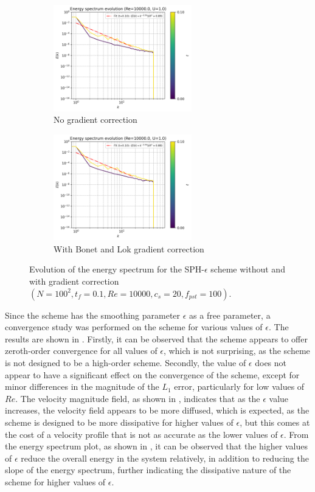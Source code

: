 \begin{figure}[htbp!]
  \begin{subfigure}{7cm}
  \centering\includegraphics[width=6cm]{Code-Figures/mon2017/grad_corr/c0_20_tait_pec_dtmul_1_mkc_no_nx_100_pst_10_re_10000_mon2017/energy_spectrum_evolution.png}
  \caption{No gradient correction}
  \end{subfigure}
  \begin{subfigure}{7cm}
  \centering\includegraphics[width=6cm]{Code-Figures/mon2017/grad_corr/c0_20_tait_pec_dtmul_1_mkc_yes_nx_100_pst_10_re_10000_mon2017/energy_spectrum_evolution.png}
  \caption{With Bonet and Lok gradient correction}
  \end{subfigure}
  \caption{Evolution of the energy spectrum for the SPH-$\epsilon$ scheme without and with gradient correction $(N=100^2, t_f=0.1, Re=10000, c_s=20, f_{pst}=100)$.}
  \label{fig:sph-eps-grad-corr-espec}
\end{figure}

Since the scheme has the smoothing parameter $\epsilon$ as a free parameter, a convergence study was performed on the scheme for various values of $\epsilon$.
The results are shown in . Firstly, it can be observed that the scheme appears to offer zeroth-order convergence for all values of $\epsilon$, which is not surprising, as the scheme is not designed to be a high-order scheme. Secondly, the value of $\epsilon$ does not appear to have a significant effect on the convergence of the scheme, except for minor differences in the magnitude of the $L_1$ error, particularly for low values of $Re$.
The velocity magnitude field, as shown in , indicates that as the $\epsilon$ value increases, the velocity field appears to be more diffused, which is expected, as the scheme is designed to be more dissipative for higher values of $\epsilon$, but this comes at the cost of a velocity profile that is not as accurate as the lower values of $\epsilon$.
From the energy spectrum plot, as shown in , it can be observed that the higher values of $\epsilon$ reduce the overall energy in the system relatively, in addition to reducing the slope of the energy spectrum, further indicating the dissipative nature of the scheme for higher values of $\epsilon$.

